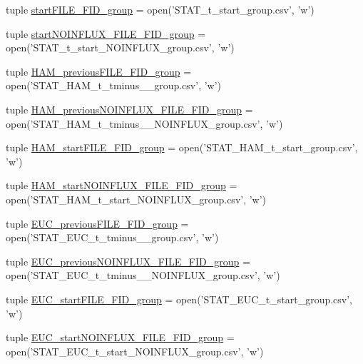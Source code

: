 \begin{DoxyCompactItemize}
\item 
tuple \hyperlink{a00104_addede16e21598cc53c446efa66bd20d9}{start\-F\-I\-L\-E\-\_\-\-F\-I\-D\-\_\-group} = open('S\-T\-A\-T\-\_\-t\-\_\-start\-\_\-group.\-csv', 'w')
\item 
tuple \hyperlink{a00104_a14eebfeaac72a017ee76d69b55033042}{start\-N\-O\-I\-N\-F\-L\-U\-X\-\_\-\-F\-I\-L\-E\-\_\-\-F\-I\-D\-\_\-group} = open('S\-T\-A\-T\-\_\-t\-\_\-start\-\_\-\-N\-O\-I\-N\-F\-L\-U\-X\-\_\-group.\-csv', 'w')
\item 
tuple \hyperlink{a00104_aa72272e636b1eafe39ed3367145433f2}{H\-A\-M\-\_\-previous\-F\-I\-L\-E\-\_\-\-F\-I\-D\-\_\-group} = open('S\-T\-A\-T\-\_\-\-H\-A\-M\-\_\-t\-\_\-tminus\-\_\-\_\-group.\-csv', 'w')
\item 
tuple \hyperlink{a00104_a092676cc95ddff57aac2aa077ce22d52}{H\-A\-M\-\_\-previous\-N\-O\-I\-N\-F\-L\-U\-X\-\_\-\-F\-I\-L\-E\-\_\-\-F\-I\-D\-\_\-group} = open('S\-T\-A\-T\-\_\-\-H\-A\-M\-\_\-t\-\_\-tminus\-\_\-\_\-\-N\-O\-I\-N\-F\-L\-U\-X\-\_\-group.\-csv', 'w')
\item 
tuple \hyperlink{a00104_ab74ecb2bab6a84c44274814862f2e96c}{H\-A\-M\-\_\-start\-F\-I\-L\-E\-\_\-\-F\-I\-D\-\_\-group} = open('S\-T\-A\-T\-\_\-\-H\-A\-M\-\_\-t\-\_\-start\-\_\-group.\-csv', 'w')
\item 
tuple \hyperlink{a00104_a4652c6dad393663e40970d7f6422c1d6}{H\-A\-M\-\_\-start\-N\-O\-I\-N\-F\-L\-U\-X\-\_\-\-F\-I\-L\-E\-\_\-\-F\-I\-D\-\_\-group} = open('S\-T\-A\-T\-\_\-\-H\-A\-M\-\_\-t\-\_\-start\-\_\-\-N\-O\-I\-N\-F\-L\-U\-X\-\_\-group.\-csv', 'w')
\item 
tuple \hyperlink{a00104_adf079c2d443f89f00a330a58f99c2095}{E\-U\-C\-\_\-previous\-F\-I\-L\-E\-\_\-\-F\-I\-D\-\_\-group} = open('S\-T\-A\-T\-\_\-\-E\-U\-C\-\_\-t\-\_\-tminus\-\_\-\_\-group.\-csv', 'w')
\item 
tuple \hyperlink{a00104_ace5cf628b305f9110e058d7dafd27fb4}{E\-U\-C\-\_\-previous\-N\-O\-I\-N\-F\-L\-U\-X\-\_\-\-F\-I\-L\-E\-\_\-\-F\-I\-D\-\_\-group} = open('S\-T\-A\-T\-\_\-\-E\-U\-C\-\_\-t\-\_\-tminus\-\_\-\_\-\-N\-O\-I\-N\-F\-L\-U\-X\-\_\-group.\-csv', 'w')
\item 
tuple \hyperlink{a00104_abe1a2acadc97e46d55c6f4164c0890dc}{E\-U\-C\-\_\-start\-F\-I\-L\-E\-\_\-\-F\-I\-D\-\_\-group} = open('S\-T\-A\-T\-\_\-\-E\-U\-C\-\_\-t\-\_\-start\-\_\-group.\-csv', 'w')
\item 
tuple \hyperlink{a00104_aef08a333d5fed02e90483cc87e389ed0}{E\-U\-C\-\_\-start\-N\-O\-I\-N\-F\-L\-U\-X\-\_\-\-F\-I\-L\-E\-\_\-\-F\-I\-D\-\_\-group} = open('S\-T\-A\-T\-\_\-\-E\-U\-C\-\_\-t\-\_\-start\-\_\-\-N\-O\-I\-N\-F\-L\-U\-X\-\_\-group.\-csv', 'w')

\end{DoxyCompactItemize}
